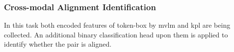 \subsubsection{Cross-modal Alignment Identification}
In this task both encoded features of token-box by \acrshort{mvlm} and \acrshort{kpl} are being collected. An additional binary classification head upon them is applied to identify whether the pair is aligned. 






















































 




